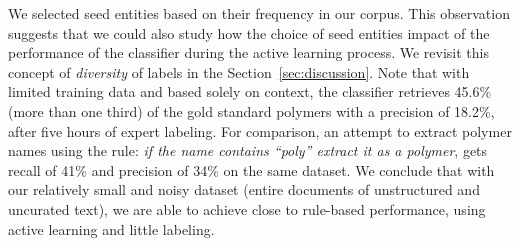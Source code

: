 We selected seed entities based on their frequency in our corpus. %
This observation suggests that we could also study how the choice of seed entities impact of the performance of the classifier during the active learning process. 
We revisit this concept of \textit{diversity} of labels in the Section~\ref{sec:discussion}. 
Note that with limited training data and based solely on context, the classifier retrieves 45.6\% (more than one third) of the gold standard polymers with a precision of 18.2\%, after five hours of expert labeling. 
For comparison, an attempt to extract polymer names using the rule: 
\textit{if the name contains ``poly'' extract it as a polymer}, gets recall of 41\% and precision of 34\% on the same dataset.
We conclude that with our relatively small and noisy dataset (entire documents of unstructured and uncurated text), we are able to achieve close to rule-based performance, 
using active learning and little labeling.

